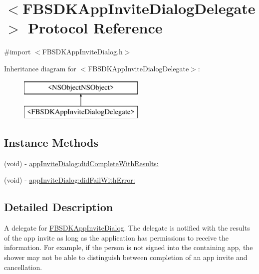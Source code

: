 \hypertarget{protocol_f_b_s_d_k_app_invite_dialog_delegate-p}{}\section{$<$F\+B\+S\+D\+K\+App\+Invite\+Dialog\+Delegate$>$ Protocol Reference}
\label{protocol_f_b_s_d_k_app_invite_dialog_delegate-p}


{\ttfamily \#import $<$F\+B\+S\+D\+K\+App\+Invite\+Dialog.\+h$>$}

Inheritance diagram for $<$F\+B\+S\+D\+K\+App\+Invite\+Dialog\+Delegate$>$\+:\begin{figure}[H]
\begin{center}
\leavevmode
\includegraphics[height=2.000000cm]{protocol_f_b_s_d_k_app_invite_dialog_delegate-p}
\end{center}
\end{figure}
\subsection*{Instance Methods}
\begin{DoxyCompactItemize}
\item 
(void) -\/ \hyperlink{protocol_f_b_s_d_k_app_invite_dialog_delegate-p_a21c9fc9d58534d6972f310d88e213bf4}{app\+Invite\+Dialog\+:did\+Complete\+With\+Results\+:}
\item 
(void) -\/ \hyperlink{protocol_f_b_s_d_k_app_invite_dialog_delegate-p_a7483f1f58a4cea0a6ddc3b28e37059cd}{app\+Invite\+Dialog\+:did\+Fail\+With\+Error\+:}
\end{DoxyCompactItemize}


\subsection{Detailed Description}
A delegate for \hyperlink{interface_f_b_s_d_k_app_invite_dialog}{F\+B\+S\+D\+K\+App\+Invite\+Dialog}.  The delegate is notified with the results of the app invite as long as the application has permissions to receive the information. For example, if the person is not signed into the containing app, the shower may not be able to distinguish between completion of an app invite and cancellation. 

